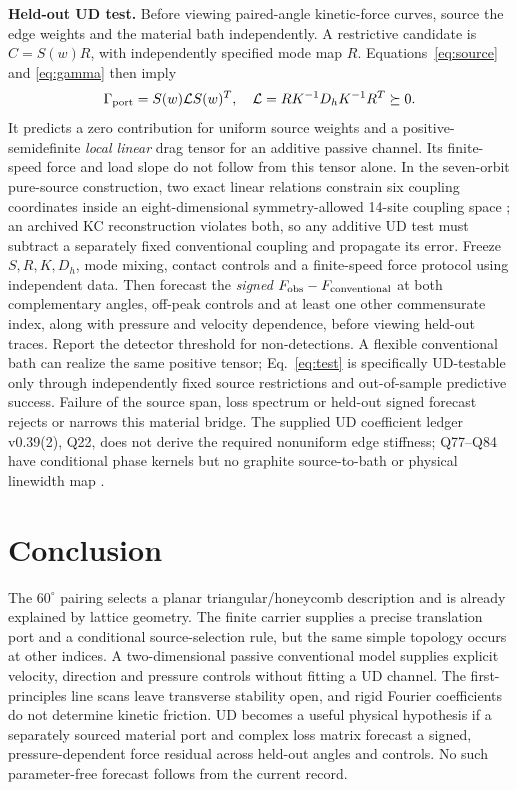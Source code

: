 \documentclass[9pt,a4paper,twocolumn]{extarticle}
\begin{document}
\textbf{Held-out UD test.} Before viewing paired-angle kinetic-force curves, source the edge weights and the material bath independently. A restrictive candidate is $C=S(w)R$, with independently specified mode map $R$. Equations~\eqref{eq:source} and \eqref{eq:gamma} then imply
\begin{equation}
 \Gamma_{\rm port}=S(w)\mathcal L S(w)^T,\quad
 \mathcal L=RK^{-1}D_hK^{-1}R^T\succeq0.\label{eq:test}
\end{equation}
It predicts a zero contribution for uniform source weights and a positive-semidefinite \emph{local linear} drag tensor for an additive passive channel. Its finite-speed force and load slope do not follow from this tensor alone. In the seven-orbit pure-source construction, two exact linear relations constrain six coupling coordinates inside an eight-dimensional symmetry-allowed 14-site coupling space \cite{udphysics}; an archived KC reconstruction violates both, so any additive UD test must subtract a separately fixed conventional coupling and propagate its error. Freeze $S,R,K,D_h$, mode mixing, contact controls and a finite-speed force protocol using independent data. Then forecast the \emph{signed} $F_{\rm obs}-F_{\rm conventional}$ at both complementary angles, off-peak controls and at least one other commensurate index, along with pressure and velocity dependence, before viewing held-out traces. Report the detector threshold for non-detections. A flexible conventional bath can realize the same positive tensor; Eq.~\eqref{eq:test} is specifically UD-testable only through independently fixed source restrictions and out-of-sample predictive success. Failure of the source span, loss spectrum or held-out signed forecast rejects or narrows this material bridge. The supplied UD coefficient ledger v0.39(2), Q22, does not derive the required nonuniform edge stiffness; Q77--Q84 have conditional phase kernels but no graphite source-to-bath or physical linewidth map \cite{udledger}.

\section{Conclusion}
The $60^\circ$ pairing selects a planar triangular/honeycomb description and is already explained by lattice geometry. The finite carrier supplies a precise translation port and a conditional source-selection rule, but the same simple topology occurs at other indices. A two-dimensional passive conventional model supplies explicit velocity, direction and pressure controls without fitting a UD channel. The first-principles line scans leave transverse stability open, and rigid Fourier coefficients do not determine kinetic friction. UD becomes a useful physical hypothesis if a separately sourced material port and complex loss matrix forecast a signed, pressure-dependent force residual across held-out angles and controls. No such parameter-free forecast follows from the current record.
\end{document}
